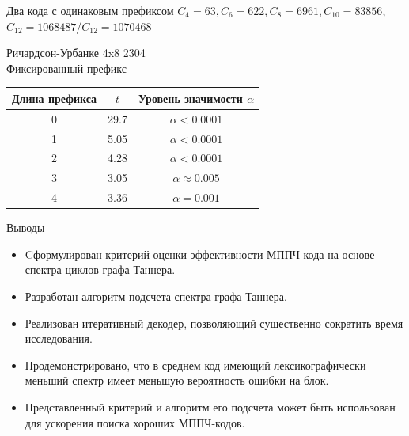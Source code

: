 \documentclass[t,13pt,graphics=pdflatex,xcolor=table,aspectratio=43]{beamer}
\begin{document}
\begin{frame}{Два кода с одинаковым префиксом}
$C_4=63, C_6=622, C_8=6961, C_{10}=83856$, $C_{12}=1068487$/$C_{12}=1070468$

\begin{figure}[h!]
\centering
\begin{subfigure}{.5\textwidth}
  \centering
\end{subfigure}%
\begin{subfigure}{.5\textwidth}
  \centering
\end{subfigure}
\end{figure}
\end{frame}

\begin{frame}{Ричардсон-Урбанке 4x8 2304 \\ Фиксированный префикс}
\begin{center}
\begin{tabular}{|c|c|c|}
	\hline
	Длина префикса & $t$ & Уровень значимости $\alpha$\\
	\hline
	0 & 29.7 &  $\alpha < 0.0001$\\
	\hline
	1 & 5.05 &  $\alpha < 0.0001$\\
	\hline
	2 & 4.28 & $\alpha < 0.0001$ \\
	\hline
	3 & 3.05 & $\alpha \approx 0.005$ \\
	\hline
	4 & 3.36 & $\alpha = 0.001$ \\
	\hline
\end{tabular}
\end{center}
\end{frame}

\begin{frame}{Выводы}
  \begin{itemize}
     \item Cформулирован критерий оценки эффективности МППЧ-кода на основе спектра циклов графа Таннера.
	\item Разработан алгоритм подсчета спектра графа Таннера.
	\item  Реализован итеративный декодер, позволяющий существенно сократить время исследования.
	\item Продемонстрировано, что в среднем код имеющий лексикографически меньший спектр имеет меньшую вероятность ошибки на блок.
	\item Представленный критерий и алгоритм его подсчета может быть использован для ускорения поиска хороших МППЧ-кодов.
  \end{itemize}
\end{frame}
\end{document}
